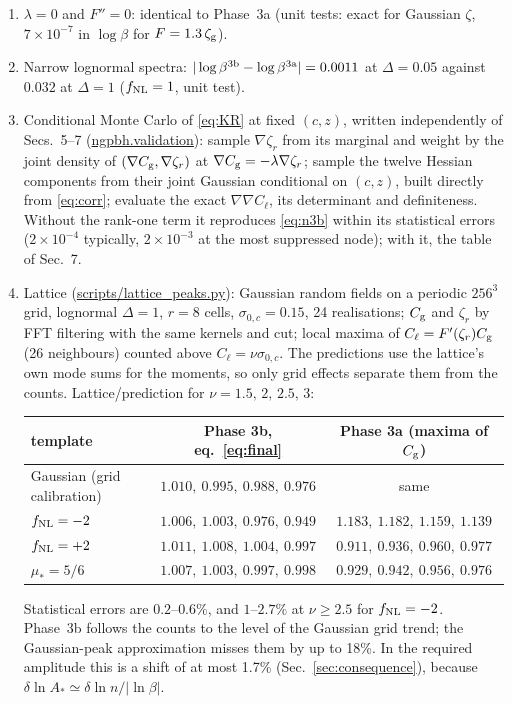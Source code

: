 \documentclass[11pt]{article}
\newcommand{\Cg}{C_{\rm g}}
\newcommand{\Cl}{C_{\ell}}
\newcommand{\zr}{\zeta_r}
\newcommand{\zg}{\zeta_{\rm g}}
\begin{document}
\begin{enumerate}
\item $\lambda=0$ and $F''=0$: identical to Phase~3a (unit tests: exact for Gaussian $\zeta$,
$7\times10^{-7}$ in $\log\beta$ for $F=1.3\,\zg$).
\item Narrow lognormal spectra: $|\log\beta^{\rm 3b}-\log\beta^{\rm 3a}|=0.0011$ at $\Delta=0.05$
against $0.032$ at $\Delta=1$ ($f_{\rm NL}=1$, unit test).
\item Conditional Monte Carlo of \eqref{eq:KR} at fixed $(c,z)$, written independently of
Secs.~5--7 (\url{ngpbh.validation}): sample $\nabla\zr$ from its marginal and weight by the
joint density of $(\nabla\Cg,\nabla\zr)$ at $\nabla\Cg=-\lambda\nabla\zr$; sample the twelve
Hessian components from their joint Gaussian conditional on $(c,z)$, built directly from
\eqref{eq:corr}; evaluate the exact $\nabla\nabla\Cl$, its determinant and definiteness. Without
the rank-one term it reproduces \eqref{eq:n3b} within its statistical errors ($2\times10^{-4}$
typically, $2\times10^{-3}$ at the most suppressed node); with it, the table of Sec.~7.
\item Lattice (\url{scripts/lattice_peaks.py}): Gaussian random fields on a periodic $256^3$
grid, lognormal $\Delta=1$, $r=8$ cells, $\sigma_{0,c}=0.15$, 24 realisations; $\Cg$ and $\zr$ by
FFT filtering with the same kernels and cut; local maxima of $\Cl=F'(\zr)\Cg$ (26 neighbours)
counted above $\Cl=\nu\sigma_{0,c}$. The predictions use the lattice's own mode sums for the
moments, so only grid effects separate them from the counts. Lattice/prediction for
$\nu=1.5,\,2,\,2.5,\,3$:

\begin{center}
\begin{tabular}{lcc}
template & Phase 3b, eq.~\eqref{eq:final} & Phase 3a (maxima of $\Cg$)\\\hline
Gaussian (grid calibration) & $1.010,\ 0.995,\ 0.988,\ 0.976$ & same\\
$f_{\rm NL}=-2$ & $1.006,\ 1.003,\ 0.976,\ 0.949$ & $1.183,\ 1.182,\ 1.159,\ 1.139$\\
$f_{\rm NL}=+2$ & $1.011,\ 1.008,\ 1.004,\ 0.997$ & $0.911,\ 0.936,\ 0.960,\ 0.977$\\
$\mu_*=5/6$ & $1.007,\ 1.003,\ 0.997,\ 0.998$ & $0.929,\ 0.942,\ 0.956,\ 0.976$\\
\end{tabular}
\end{center}
Statistical errors are $0.2$--$0.6\%$, and $1$--$2.7\%$ at $\nu\ge2.5$ for $f_{\rm NL}=-2$. Phase~3b
follows the counts to the level of the Gaussian grid trend; the Gaussian-peak approximation
misses them by up to 18\%. In the required amplitude this is a shift of at most 1.7\%
(Sec.~\ref{sec:consequence}), because $\delta\ln A_*\simeq\delta\ln n/|\ln\beta|$.
\end{enumerate}
\end{document}
